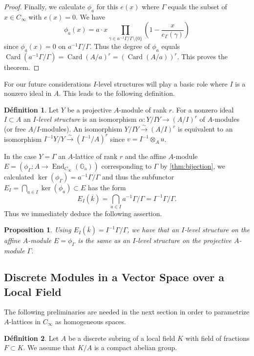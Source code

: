 \documentclass[12pt,a4paper]{article}
\theoremstyle{plain}
\newtheorem{proposition}{Proposition}[section]
\theoremstyle{definition}
\newtheorem{definition}{D\'efinition}[section]
\theoremstyle{remark}
\DeclareMathOperator{\End}{End}
\DeclareMathOperator{\Card}{Card}
\newcommand{\Ga}{\mathbb{G}_\mathrm{a}}
\providecommand{\Ga}{\mathbb{G}_{\mathrm a}}
\providecommand{\End}{\operatorname{End}}
\begin{document}
\begin{proof}
Finally, we calculate $\phi_a$ for this $e(x)$ where $\Gamma$ equals the subset of $x \in C_\infty$ with $e(x) = 0$. We have
\[
\phi_a(x) = a \cdot x \prod_{\gamma \in a^{-1}\Gamma/\Gamma \setminus \{0\}} \left(1 - \frac{x}{e_\Gamma(\gamma)}\right)
\]
since $\phi_a(x) = 0$ on $a^{-1}\Gamma/\Gamma$. Thus the degree of $\phi_a$ equals $\Card(a^{-1}\Gamma/\Gamma) = \Card(A/a)^r = (\Card(A/a))^r$. This proves the theorem.
\end{proof}

For our future considerations $I$-level structures will play a basic role where $I$ is a nonzero ideal in $A$. This leads to the following definition.

\begin{definition}
\label{def:ilevel}
Let $Y$ be a projective $A$-module of rank $r$. For a nonzero ideal $I \subset A$ an \emph{$I$-level structure} is an isomorphism $\alpha: Y/IY \to (A/I)^r$ of $A$-modules (or free $A/I$-modules). An isomorphism $Y/IY \xrightarrow{\sim} (A/I)^r$ is equivalent to an isomorphism $I^{-1}Y/Y \xrightarrow{\sim} (I^{-1}/A)^r$ since $v = I^{-1} \otimes_A u$.
\end{definition}

In the case $Y = \Gamma$ an $A$-lattice of rank $r$ and the affine $A$-module $E = (\phi_\Gamma: A \to \End_{C_\infty}(\Ga))$ corresponding to $\Gamma$ by \eqref{thm:bijection}, we calculated $\ker(\phi_\Gamma) = a^{-1}\Gamma/\Gamma$ and thus the subfunctor $E_I = \bigcap_{a \in I} \ker(\phi_a) \subset E$ has the form
\[
E_I(\overline{k}) = \bigcap_{a \in I} a^{-1}\Gamma/\Gamma = I^{-1}\Gamma/\Gamma.
\]
Thus we immediately deduce the following assertion.

\begin{proposition}
\label{prop:ilevel}
Using $E_I(\overline{k}) = I^{-1}\Gamma/\Gamma$, we have that an $I$-level structure on the affine $A$-module $E = \phi_\Gamma$ is the same as an $I$-level structure on the projective $A$-module $\Gamma$.
\end{proposition}

\subsection{Discrete Modules in a Vector Space over a Local Field}
\label{sec:discrete}

The following preliminaries are needed in the next section in order to parametrize $A$-lattices in $C_\infty$ as homogeneous spaces.

\begin{definition}
\label{def:discrete}
Let $A$ be a discrete subring of a local field $K$ with field of fractions $F \subset K$. We assume that $K/A$ is a compact abelian group.
\end{definition}
\end{document}
